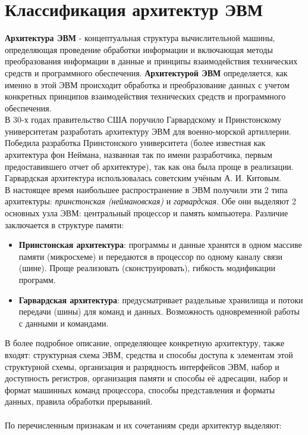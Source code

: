 \section{Классификация архитектур ЭВМ}
\textbf{Архитектура ЭВМ} - концептуальная структура вычислительной машины, определяющая проведение обработки информации и включающая методы преобразования информации в данные и принципы взаимодействия технических средств и программного обеспечения. \textbf{Архитектурой ЭВМ} определяется, как именно в этой ЭВМ происходит обработка и преобразование данных с учетом конкретных принципов взаимодействия технических средств и программного обеспечения.
\\В 30-х годах правительство США поручило Гарвардскому и Принстонскому университетам разработать архитектуру ЭВМ для военно-морской артиллерии. Победила разработка Принстонского университета (более известная как архитектура фон Неймана, названная так по имени разработчика, первым предоставившего отчет об архитектуре), так как она была проще в реализации. Гарвардская архитектура использовалась советским учёным А. И. Китовым.
\\В настоящее время наибольшее распространение в ЭВМ получили эти 2 типа архитектуры: \emph{принстонская (неймановская)} и \emph{гарвардская}. Обе они выделяют 2 основных узла ЭВМ: центральный процессор и память компьютера. Различие заключается в структуре памяти:
\begin{itemize}
  \item \textbf{Принстонская архитектура}: программы и данные хранятся в одном массиве памяти (микросхеме) и передаются в процессор по одному каналу связи (шине). Проще реализовать (сконструировать), гибкость модификации программ.
  \item \textbf{Гарвардская архитектура}: предусматривает раздельные хранилища и потоки передачи (шины) для команд и данных. Возможность одновременной работы с данными и командами.
\end{itemize}
В более подробное описание, определяющее конкретную архитектуру, также входят: структурная схема ЭВМ, средства и способы доступа к элементам этой структурной схемы, организация и разрядность интерфейсов ЭВМ, набор и доступность регистров, организация памяти и способы её адресации, набор и формат машинных команд процессора, способы представления и форматы данных, правила обработки прерываний. \\
\\По перечисленным признакам и их сочетаниям среди архитектур выделяют:
